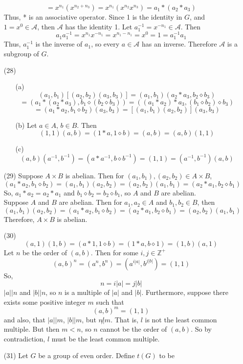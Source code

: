 \documentclass[12pt]{article}
\begin{document}
\begin{itemize}
$$= x^{n_1}(x^{n_2 + n_3}) = x^{n_1}(x^{n_2}x^{n_3}) = a_1 * (a_2 * a_3)$$
Thus, * is an associative operator. Since 1 is the identity in $G$, and $1 = x^0 \in \mathcal{A}$, then $\mathcal{A}$ has the identity 1. Let $a_1^{-1} = x^{-n_1} \in \mathcal{A}$. Then
$$a_1a_1^{-1} = x^{n_1}x^{-n_1} = x^{n_1 - n_1} = x^0 = 1 = a_1^{-1}a_1$$
Thus, $a_1^{-1}$ is the inverse of $a_1$, so every $a \in \mathcal{A}$ has an inverse. Therefore $\mathcal{A}$ is a subgroup of $G$.
\item[(28)]
\begin{itemize}
\item[(a)]
$$(a_1, b_1)[(a_2, b_2)(a_3, b_3)] = (a_1, b_1)(a_2 * a_3, b_2 \diamond b_3)$$
$$= (a_1 * (a_2 * a_3), b_1 \diamond (b_2 \diamond b_3)) = ((a_1 * a_2) * a_3, (b_1 \diamond b_2) \diamond b_3)$$
$$= (a_1 * a_2, b_1 \diamond b_2)(a_3, b_3) = [(a_1, b_1)(a_2, b_2)](a_3, b_3)$$
\item[(b)] Let $a \in A$, $b \in B$. Then
$$(1, 1)(a, b) = (1 * a, 1 \diamond b) = (a, b) = (a, b)(1, 1)$$
\item[(c)]
$$(a, b)(a^{-1}, b^{-1}) = (a * a^{-1}, b \diamond b^{-1}) = (1, 1) = (a^{-1}, b^{-1})(a, b)$$
\end{itemize}
\item[(29)]
Suppose $A \times B$ is abelian. Then for $(a_1, b_1), (a_2, b_2) \in A \times B$,
$$(a_1 * a_2, b_1 \diamond b_2) = (a_1, b_1)(a_2, b_2) =  (a_2, b_2)(a_1, b_1) = (a_2 * a_1, b_2 \diamond b_1)$$
So, $a_1 * a_2 = a_2 * a_1$ and $b_1 \diamond b_2 = b_2 \diamond b_1$, so $A$ and $B$ are abelian. \\
Suppose $A$ and $B$ are abelian. Then for $a_1, a_2 \in A$ and $b_1, b_2 \in B$, then
$$(a_1, b_1)(a_2, b_2) = (a_1 * a_2, b_1 \diamond b_2) = (a_2 * a_1, b_2 \diamond b_1) =  (a_2, b_2)(a_1, b_1)$$
Therefore, $A \times B$ is abelian.
\item[(30)]
$$(a, 1)(1, b) = (a * 1, 1 \diamond b) = (1 * a, b \diamond 1) = (1, b)(a, 1)$$
Let $n$ be the order of $(a, b)$. Then for some $i, j \in \mathbb{Z}^+$
$$(a, b)^n = (a^n, b^n) = (a^{i|a|}, b^{j|b|}) = (1, 1)$$
So,
$$n = i|a| = j|b|$$
$|a| | n$ and $|b| | n$, so $n$ is a multiple of $|a|$ and $|b|$. Furthermore, suppose there exists some positive integer $m$ such that
$$(a, b)^m = (1, 1)$$
and also, that $|a| | m$, $|b| | m$, but $n \not | m$. That is, $l$ is not the least common multiple. But then $m < n$, so $n$ cannot be the order of $(a, b)$. So by contradiction, $l$ must be the least common multiple.
\item[(31)]
Let $G$ be a group of even order. Define $t(G)$ to be

\end{itemize}
\end{document}
